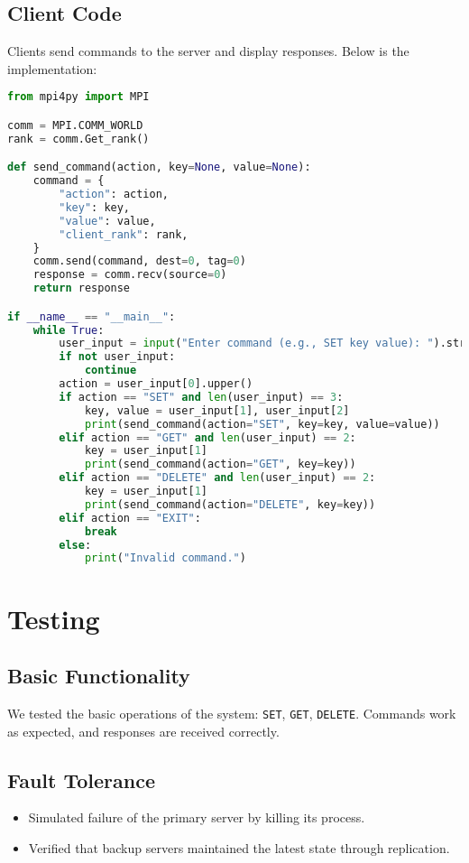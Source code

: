 \documentclass[12pt]{article}
\begin{document}
\subsection{Client Code}
Clients send commands to the server and display responses. Below is the implementation:

\lstset{caption=Client Code}
\begin{lstlisting}[language=Python]
from mpi4py import MPI

comm = MPI.COMM_WORLD
rank = comm.Get_rank()

def send_command(action, key=None, value=None):
    command = {
        "action": action,
        "key": key,
        "value": value,
        "client_rank": rank,
    }
    comm.send(command, dest=0, tag=0)
    response = comm.recv(source=0)
    return response

if __name__ == "__main__":
    while True:
        user_input = input("Enter command (e.g., SET key value): ").strip().split()
        if not user_input:
            continue
        action = user_input[0].upper()
        if action == "SET" and len(user_input) == 3:
            key, value = user_input[1], user_input[2]
            print(send_command(action="SET", key=key, value=value))
        elif action == "GET" and len(user_input) == 2:
            key = user_input[1]
            print(send_command(action="GET", key=key))
        elif action == "DELETE" and len(user_input) == 2:
            key = user_input[1]
            print(send_command(action="DELETE", key=key))
        elif action == "EXIT":
            break
        else:
            print("Invalid command.")
\end{lstlisting}

\section{Testing}
\subsection{Basic Functionality}
We tested the basic operations of the system:\newline
\texttt{SET}, \texttt{GET}, \texttt{DELETE}. Commands work as expected, and responses are received correctly.

\subsection{Fault Tolerance}
\begin{itemize}
    \item Simulated failure of the primary server by killing its process.
    \item Verified that backup servers maintained the latest state through replication.
\end{itemize}
\end{document}
